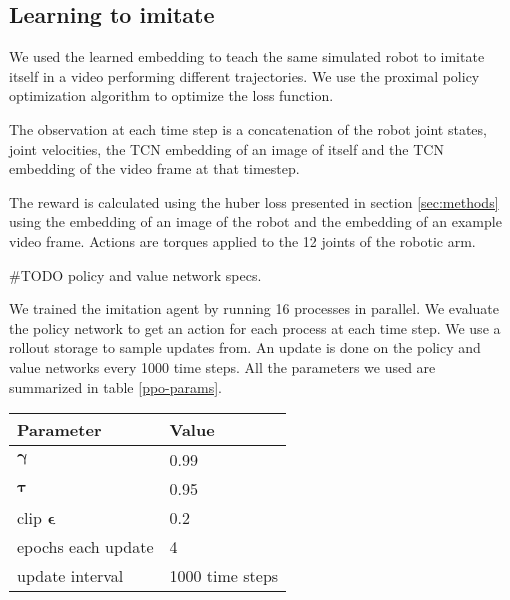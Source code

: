 \subsection{Learning to imitate}

We used the learned embedding to teach the same simulated robot to imitate itself in a video performing different trajectories. We use the proximal policy optimization algorithm to optimize the loss function.

The observation at each time step is a concatenation of the robot joint states, joint velocities, the TCN embedding of an image of itself and the TCN embedding of the video frame at that timestep.

The reward is calculated using the huber loss presented in section \ref{sec:methods} using the embedding of an image of the robot and the embedding of an example video frame. Actions are torques applied to the 12 joints of the robotic arm.

\#TODO policy and value network specs.

We trained the imitation agent by running 16 processes in parallel. We evaluate the policy network to get an action for each process at each time step. We use a rollout storage to sample updates from. An update is done on the policy and value networks every 1000 time steps. All the parameters we used are summarized in table \ref{ppo-params}.

{
    \vspace{0.5cm}
    \centering
    \begin{tabular}{@{}ll@{}}
    \toprule
    \textbf{Parameter}             & \textbf{Value}    \\ \midrule
    $\boldsymbol{\gamma}$        & 0.99                \\
    $\boldsymbol{\tau}$        & 0.95                \\
    clip $\boldsymbol{\epsilon}$        & 0.2                \\
    epochs each update        & 4                \\
    update interval        & 1000 time steps                \\
    \end{tabular}
    \label{ppo-params}
}
